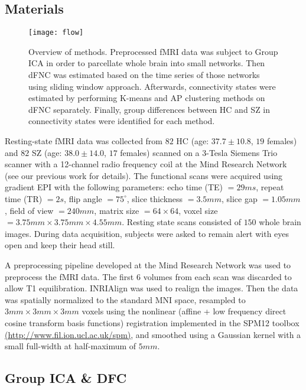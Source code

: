 \documentclass{article}
\begin{document}
\subsection{Materials}
\label{sec:Materials}

\begin{figure}
  \centering
  \centerline{\texttt{[image: flow]}}
  \caption{Overview of methods. Preprocessed \acs{fMRI} data was subject to Group \acs{ICA} in order to parcellate whole brain into small networks. Then \ac{dFNC} was estimated based on the time series of those networks using sliding window approach. Afterwards, connectivity states were estimated by performing K-means and \acl{AP} clustering methods on dFNC separately. Finally, group differences between \ac{HC} and \ac{SZ} in connectivity states were identified for each method.}
  \label{fig:Overview}
\end{figure}

Resting-state \ac{fMRI} data was collected from $82$ \ac{HC} (age: $37.7 \pm 10.8$, $19$ females) and $82$ \ac{SZ} (age: $38.0 \pm 14.0$, $17$ females) scanned on a 3-Tesla Siemens Trio scanner with a 12-channel radio frequency coil at the Mind Research Network (see our previous work \cite{du_interaction_2016} for details). The functional scans were acquired using gradient \ac{EPI} with the following parameters: echo time (TE) $= 29ms$, repeat time (TR) $= 2s$, flip angle $= 75^\circ$, slice thickness $= 3.5mm$, slice gap $= 1.05mm$, field of view $= 240mm$, matrix size $= 64\times 64$, voxel size $= 3.75mm\times 3.75mm \times 4.55mm$. Resting state scans consisted of $150$ whole brain images. During data acquisition, subjects were asked to remain alert with eyes open and keep their head still.

A preprocessing pipeline developed at the Mind Research Network \cite{bockholt_mining_2010} was used to preprocess the fMRI data. The first $6$ volumes from each scan was discarded to allow T1 equilibration. INRIAlign \cite{freire_what_2002} was used to realign the images. Then the data was spatially normalized to the standard \ac{MNI} space, resampled to $3mm\times 3mm\times 3mm$ voxels using the nonlinear (affine + low frequency direct cosine transform basis functions) registration implemented in the SPM12 toolbox \href{http://www.fil.ion.ucl.ac.uk/spm}{(http://www.fil.ion.ucl.ac.uk/spm)}, and smoothed using a Gaussian kernel with a small full-width at half-maximum of $5mm$.

\subsection{Group \ac{ICA} \& \acs{DFC}}
\label{sec:Group}
\end{document}
